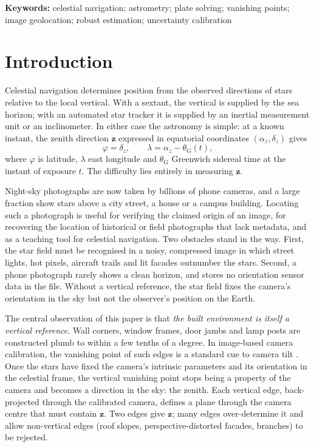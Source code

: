 \documentclass[11pt,a4paper]{article}
\newcommand{\z}{\bm{z}}
\begin{document}
\noindent\textbf{Keywords:} celestial navigation; astrometry; plate solving; vanishing points; image geolocation; robust estimation; uncertainty calibration

\section{Introduction}

Celestial navigation determines position from the observed directions of stars relative to the local vertical. With a sextant, the vertical is supplied by the sea horizon; with an automated star tracker it is supplied by an inertial measurement unit or an inclinometer. In either case the astronomy is simple: at a known instant, the zenith direction $\z$ expressed in equatorial coordinates $(\alpha_z,\delta_z)$ gives
\begin{equation}
\varphi = \delta_z, \qquad \lambda = \alpha_z - \theta_{\mathrm{G}}(t),
\label{eq:fix}
\end{equation}
where $\varphi$ is latitude, $\lambda$ east longitude and $\theta_{\mathrm G}$ Greenwich sidereal time at the instant of exposure $t$. The difficulty lies entirely in measuring $\z$.

Night-sky photographs are now taken by billions of phone cameras, and a large fraction show stars above a city street, a house or a campus building. Locating such a photograph is useful for verifying the claimed origin of an image, for recovering the location of historical or field photographs that lack metadata, and as a teaching tool for celestial navigation. Two obstacles stand in the way. First, the star field must be recognised in a noisy, compressed image in which street lights, hot pixels, aircraft trails and lit facades outnumber the stars. Second, a phone photograph rarely shows a clean horizon, and stores no orientation sensor data in the file. Without a vertical reference, the star field fixes the camera's orientation in the sky but not the observer's position on the Earth.

The central observation of this paper is that \emph{the built environment is itself a vertical reference}. Wall corners, window frames, door jambs and lamp posts are constructed plumb to within a few tenths of a degree. In image-based camera calibration, the vanishing point of such edges is a standard cue to camera tilt \citep{zhai2016horizon,pautrat2023deeplsd}. Once the stars have fixed the camera's intrinsic parameters and its orientation in the celestial frame, the vertical vanishing point stops being a property of the camera and becomes a direction in the sky: the zenith. Each vertical edge, back-projected through the calibrated camera, defines a plane through the camera centre that must contain $\z$. Two edges give $\z$; many edges over-determine it and allow non-vertical edges (roof slopes, perspective-distorted facades, branches) to be rejected.
\end{document}

